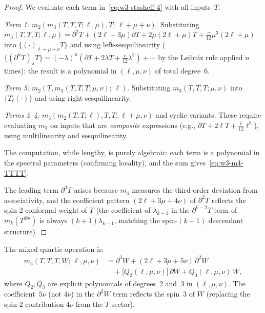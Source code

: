 \begin{proof}
We evaluate each term in~\eqref{eq:w3-stasheff-4} with all inputs~$T$.

\emph{Term 1:} $m_2(m_3(T,T,T;\ell,\mu), T;\, \ell+\mu+\nu)$.
Substituting $m_3(T,T,T;\ell,\mu) = \partial^2 T + (2\ell+3\mu)\partial T
+ 2\mu(2\ell+\mu)T + \tfrac{c}{12}\mu^3(2\ell+\mu)$
into $\{(\cdot)_{\ell+\mu+\nu} T\}$ and using left-sesquilinearity
($\{(\partial^n T)_\lambda T\} = (-\lambda)^n(\partial T + 2\lambda T +
\tfrac{c}{12}\lambda^3) + \cdots$ by the Leibniz rule applied $n$ times):
the result is a polynomial in $(\ell,\mu,\nu)$ of total degree~$6$.

\emph{Term 5:} $m_2(T, m_3(T,T,T;\mu,\nu);\, \ell)$.
Substituting $m_3(T,T,T;\mu,\nu)$ into
$\{T_\ell (\cdot)\}$ and using right-sesquilinearity.

\emph{Terms 2--4:} $m_3(m_2(T,T;\ell), T, T;\, \ell+\mu, \nu)$ and
cyclic variants. These require evaluating $m_3$ on inputs that are
\emph{composite} expressions (e.g., $\partial T + 2\ell T +
\tfrac{c}{12}\ell^3$), using multilinearity and sesquilinearity.

The computation, while lengthy, is purely algebraic:
each term is a polynomial in the spectral parameters (confirming
locality), and the sum gives~\eqref{eq:w3-m4-TTTT}.

The leading term $\partial^3 T$ arises because $m_4$ measures the
third-order deviation from associativity, and the coefficient pattern
$(2\ell + 3\mu + 4\nu)$ of $\partial^2 T$ reflects the spin-2
conformal weight of $T$ (the coefficient of $\lambda_{k-1}$ in the
$\partial^{k-2} T$ term of $m_k(T^{\otimes k})$ is always $(k+1)\lambda_{k-1}$,
matching the spin-$(k-1)$ descendant structure).
\end{proof}

\begin{theorem}[Explicit $m_4(T,T,T,W)$]
\label{thm:w3-m4-TTTW}
The mixed quartic operation is:
\begin{equation}
\label{eq:w3-m4-TTTW}
\begin{aligned}
m_4(T,T,T,W;\,\ell,\mu,\nu)
&= \partial^3 W + (2\ell + 3\mu + 5\nu)\,\partial^2 W\\
&\quad + \bigl[Q_2(\ell,\mu,\nu)\bigr]\,\partial W
 + Q_3(\ell,\mu,\nu)\, W,
\end{aligned}
\end{equation}
where $Q_2, Q_3$ are explicit polynomials of degrees~$2$ and~$3$ in
$(\ell,\mu,\nu)$. The coefficient~$5\nu$ (not $4\nu$) in the
$\partial^2 W$ term reflects the spin~$3$ of $W$ (replacing the
spin-$2$ contribution $4\nu$ from the $T$-sector).
\end{theorem}

